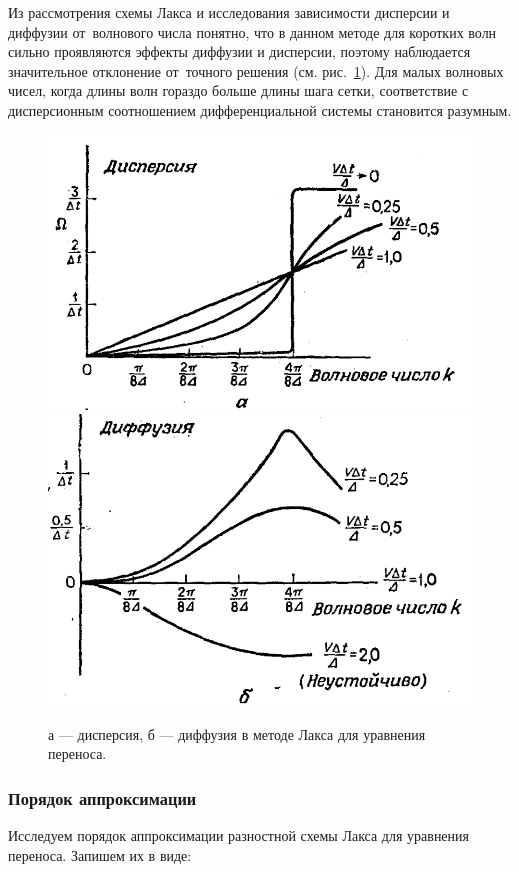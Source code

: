 \documentclass[12pt,a4paper]{article}
\begin{document}
	Из рассмотрения схемы Лакса и исследования зависимости дисперсии и диффузии от~волнового числа \cite{book_numphys} понятно, что в данном методе для коротких волн сильно проявляются эффекты диффузии и дисперсии, поэтому наблюдается значительное отклонение от~точного решения (см. рис.~\ref{fig:DR}). Для малых волновых чисел, когда длины волн гораздо больше длины шага сетки, соответствие с дисперсионным соотношением дифференциальной системы становится разумным.
	\begin{figure}[!h]
		\centering
		\includegraphics[width=0.45\linewidth]{figures/dispersio.png}
		\hspace{1em}
		\includegraphics[width=0.39\linewidth]{figures/diffusio.png}
		\caption{а --- дисперсия, б --- диффузия в методе Лакса для уравнения переноса.}
		\label{fig:DR}
	\end{figure}
	
	\subsubsection{Порядок аппроксимации}
	Исследуем порядок аппроксимации разностной схемы Лакса для уравнения переноса. Запишем их в виде: %
	
\end{document}
